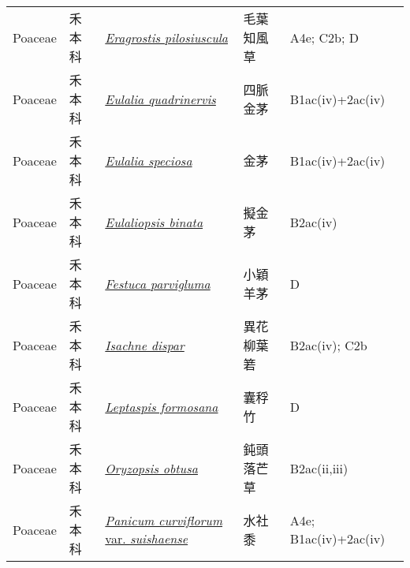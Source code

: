 {\begin{longtable}{L{2.5cm}L{2cm}L{5cm}L{2.5cm}L{3cm}}
    Poaceae & 禾本科 & \href{http://www.theplantlist.org/tpl1.1/search?q=Eragrostis+pilosiuscula}{\textit{Eragrostis pilosiuscula} } & 毛葉知風草 & A4e; C2b; D    \\
    Poaceae & 禾本科 & \href{http://www.theplantlist.org/tpl1.1/search?q=Eulalia+quadrinervis}{\textit{Eulalia quadrinervis} } & 四脈金茅 & B1ac(iv)+2ac(iv)    \\
    Poaceae & 禾本科 & \href{http://www.theplantlist.org/tpl1.1/search?q=Eulalia+speciosa}{\textit{Eulalia speciosa} } & 金茅 & B1ac(iv)+2ac(iv)    \\
    Poaceae & 禾本科 & \href{http://www.theplantlist.org/tpl1.1/search?q=Eulaliopsis+binata}{\textit{Eulaliopsis binata} } & 擬金茅 & B2ac(iv)    \\
    Poaceae & 禾本科 & \href{http://www.theplantlist.org/tpl1.1/search?q=Festuca+parvigluma}{\textit{Festuca parvigluma} } & 小穎羊茅 & D    \\
    Poaceae & 禾本科 & \href{http://www.theplantlist.org/tpl1.1/search?q=Isachne+dispar}{\textit{Isachne dispar} } & 異花柳葉箬 & B2ac(iv); C2b    \\
    Poaceae & 禾本科 & \href{http://www.theplantlist.org/tpl1.1/search?q=Leptaspis+formosana}{\textit{Leptaspis formosana} } & 囊稃竹 & D    \\
    Poaceae & 禾本科 & \href{http://www.theplantlist.org/tpl1.1/search?q=Oryzopsis+obtusa}{\textit{Oryzopsis obtusa} } & 鈍頭落芒草 & B2ac(ii,iii)    \\
    Poaceae & 禾本科 & \href{http://www.theplantlist.org/tpl1.1/search?q=Panicum+curviflorum+var.+suishaense}{\textit{Panicum curviflorum} var. \textit{suishaense} } & 水社黍 & A4e; B1ac(iv)+2ac(iv)    \\

\end{longtable}}
